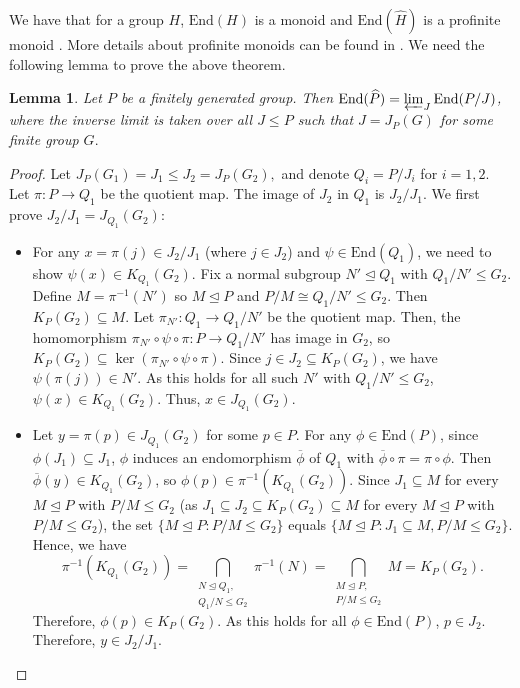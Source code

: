 \documentclass[12pt]{amsart}
\newtheorem{lemma}[theorem]{Lemma}
\begin{document}
We have that for a group $H$, $\mathrm{End}(H)$ is a monoid and $\mathrm{End}(\widehat{H})$ is a profinite monoid \cite{almeida2020profinite}. More details about profinite monoids can be found in \cite{almeida2020profinite}. We need the following lemma to prove the above theorem. 

\begin{lemma}\label{promon}
    Let $P$ be a finitely generated group. Then $\mathrm{End} (\widehat{P}) = \varprojlim_{J} \mathrm{End}(P/J)$, where the inverse limit is taken over all $J \leq P$ such that $J = J_P(G)$ for some finite group $G.$
\end{lemma}

\begin{proof}
    Let $J_P(G_1) = J_1 \leq J_2 = J_P(G_2), $ and denote $Q_i = P/J_i $ for $i = 1,2.$ Let $\pi: P \to Q_1$ be the quotient map. The image of $J_2$ in $Q_1$ is $J_2/J_1$. We first prove $J_2/J_1 = J_{Q_1}(G_2)$: 

    \begin{itemize}
        \item[($\subseteq$)] For any $x = \pi(j) \in J_2/J_1$ (where $j \in J_2$) and $\psi \in \mathrm{End}(Q_1)$, we need to show $\psi(x) \in K_{Q_1}(G_2)$. Fix a normal subgroup $N' \unlhd Q_1$ with $Q_1/N' \leq G_2$. Define $M = \pi^{-1}(N')$ so $M \unlhd P$ and $P/M \cong Q_1/N' \leq G_2$. Then $K_P(G_2) \subseteq M$. Let $\pi_{N'} : Q_1 \to Q_1/N'$ be the quotient map. Then, the homomorphism $\pi_{N'} \circ \psi \circ \pi: P \to Q_1/N'$ has image in $G_2$, so $K_P(G_2) \subseteq \ker(\pi_{N'} \circ \psi \circ \pi)$. Since $j \in J_2 \subseteq K_P(G_2)$, we have $\psi(\pi(j)) \in N'$. As this holds for all such $N'$ with $Q_1/N' \leq G_2$, $\psi(x) \in K_{Q_1}(G_2)$. Thus, $x \in J_{Q_1}(G_2)$.
        \item[($\supseteq$)] Let $y = \pi(p) \in J_{Q_1}(G_2)$ for some $p \in P$. For any $\phi \in \mathrm{End}(P)$, since $\phi(J_1) \subseteq J_1$, $\phi$ induces an endomorphism $\overline{\phi}$ of $Q_1$ with $\overline{\phi} \circ \pi = \pi \circ \phi$. Then $\overline{\phi}(y) \in K_{Q_1}(G_2)$, so $\phi(p) \in \pi^{-1}(K_{Q_1}(G_2))$. Since $J_1 \subseteq M$ for every $M \unlhd P$ with $P/M \leq G_2$ (as $J_1 \subseteq J_2 \subseteq K_P(G_2) \subseteq M$ for every $M \unlhd P$ with $P/M \leq G_2$), the set $\{M \unlhd P : P/M \leq G_2\}$ equals $\{M \unlhd P : J_1 \subseteq M,  P/M \leq G_2\}$. Hence, we have
        $$
        \pi^{-1}(K_{Q_1}(G_2)) = \bigcap_{\substack{N \unlhd Q_1,\\ {Q_1}/{N} \leq G_2}} \pi^{-1}(N) = \bigcap_{\substack{M \unlhd P, \\ P/M \leq G_2}} M = K_P(G_2).
        $$
        Therefore, $\phi(p) \in K_P(G_2)$. As this holds for all $\phi \in \mathrm{End}(P)$, $p \in J_2$. Therefore, $y \in J_2/J_1$.
    \end{itemize}


\end{proof}
\end{document}

